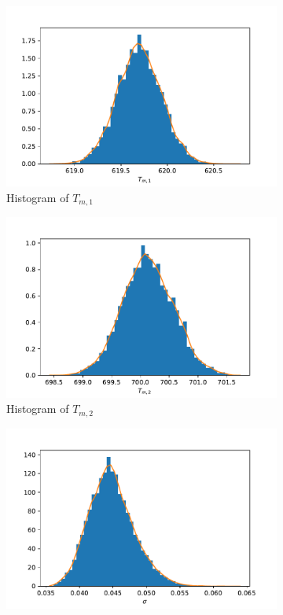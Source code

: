 \begin{figure}[h!]
\begin{subfigure}{0.5\textwidth}
\includegraphics[width=\linewidth]{figures/bayesian/2_reactions/mass_close/hist_Tm1.pdf}
\caption{Histogram of $T_{m,1}$}
\label{HistTm12}
\end{subfigure}%
\begin{subfigure}{0.5\textwidth}
\centering
\includegraphics[width=\linewidth]{figures/bayesian/2_reactions/mass_close/hist_Tm2.pdf}
\caption{Histogram of $T_{m,2}$}
\label{HistTm22}
\end{subfigure}%
\newline
\begin{subfigure}{0.5\textwidth}
\centering
\includegraphics[width=\linewidth]{figures/bayesian/2_reactions/mass_close/hist_sigma.pdf}

\end{subfigure}
\end{figure}

